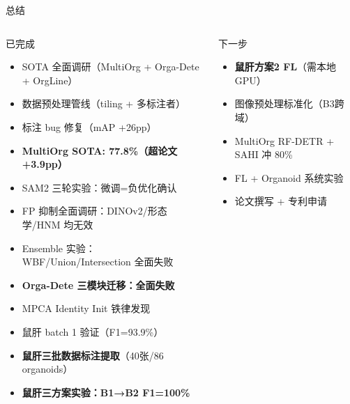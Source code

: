 \documentclass[aspectratio=169, 10pt]{beamer}
\begin{document}
\begin{frame}{总结}
  \begin{columns}[T]
    \begin{block}{已完成}
      \begin{itemize}
        \item[\checkmark] SOTA 全面调研（MultiOrg + Orga-Dete + OrgLine）
        \item[\checkmark] 数据预处理管线（tiling + 多标注者）
        \item[\checkmark] 标注 bug 修复（mAP +26pp）
        \item[\checkmark] \textbf{MultiOrg SOTA: 77.8\%（超论文 +3.9pp）}
        \item[\checkmark] SAM2 三轮实验：微调=负优化确认
        \item[\checkmark] FP 抑制全面调研：DINOv2/形态学/HNM 均无效
        \item[\checkmark] Ensemble 实验：WBF/Union/Intersection 全面失败
        \item[\checkmark] \textbf{Orga-Dete 三模块迁移：全面失败}
        \item[\checkmark] MPCA Identity Init 铁律发现
        \item[\checkmark] 鼠肝 batch 1 验证（F1=93.9\%）
        \item[\checkmark] \textbf{鼠肝三批数据标注提取}（40张/86 organoids）
        \item[\checkmark] \textbf{鼠肝三方案实验：B1→B2 F1=100\%}
      \end{itemize}
    \end{block}
    \begin{block}{下一步}
      \begin{itemize}
        \item[$\rightarrow$] \textbf{鼠肝方案2 FL}（需本地GPU）
        \item[$\rightarrow$] 图像预处理标准化（B3跨域）
        \item[$\circ$] MultiOrg RF-DETR + SAHI 冲 80\%
        \item[$\circ$] FL + Organoid 系统实验
        \item[$\circ$] 论文撰写 + 专利申请
      \end{itemize}
    \end{block}
  \end{columns}
\end{frame}
\end{document}
